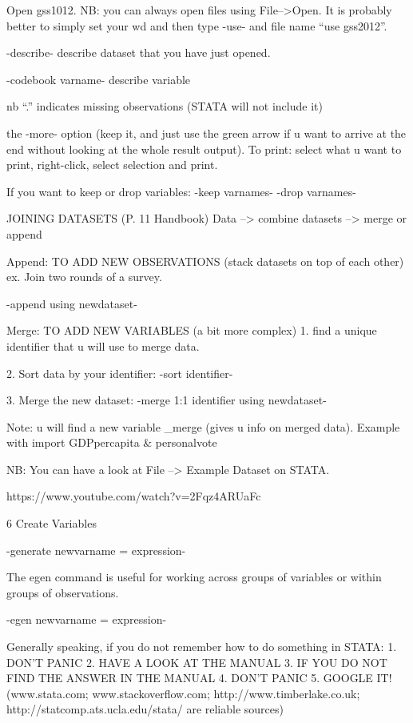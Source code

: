 \documentclass[11pt]{article}
\theoremstyle{definition}
\begin{document}
Open gss1012. NB: you can always open files using File-->Open.
It is probably better to simply set your wd and then type -use- and file name “use gss2012”.

-describe-
describe dataset that you have just opened.

-codebook varname-
describe variable

nb “.” indicates missing observations (STATA will not include it)

the -more- option (keep it, and just use the green arrow if u want to arrive at the end without looking at the whole result output).
To print: select what u want to print, right-click, select selection and print.

If you want to keep or drop variables:
-keep varnames-
-drop varnames-


JOINING DATASETS (P. 11 Handbook)
Data --> combine datasets --> merge or append

Append: TO ADD NEW OBSERVATIONS  (stack datasets on top of each other)
ex. Join two rounds of a survey.

-append using newdataset-


Merge: TO ADD NEW VARIABLES (a bit more complex)
1.	find a unique identifier that u will use to merge data.

2.	Sort data by your identifier: -sort identifier-

3.	Merge the new dataset:   -merge 1:1 identifier using newdataset-

Note: u will find a new variable  _merge (gives u info on merged data).
Example with import GDPpercapita & personalvote

NB: You can have a look at File --> Example Dataset on STATA.

https://www.youtube.com/watch?v=2Fqz4ARUaFc

6 Create Variables

-generate newvarname = expression-

The egen command is useful for working across groups of variables or within groups of observations.

-egen newvarname  = expression-

Generally speaking, if you do not remember how to do something in STATA:
1.	DON'T PANIC
2.	HAVE A LOOK AT THE MANUAL
3.	IF YOU DO NOT FIND THE ANSWER IN THE MANUAL
4.	DON'T PANIC
5.	GOOGLE IT! (www.stata.com; www.stackoverflow.com; http://www.timberlake.co.uk; http://statcomp.ats.ucla.edu/stata/ are reliable sources)
\end{document}
